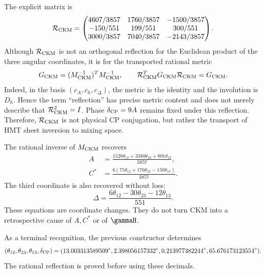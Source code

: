 The explicit matrix is
\begin{equation}
\label{eq:modular-Rckm-matrix}
\mathcal R_{\rm CKM}=
\begin{pmatrix}
4607/3857&1760/3857&-1500/3857\\
-150/551&199/551&300/551\\
3000/3857&7040/3857&-2143/3857
\end{pmatrix}.
\end{equation}
Although \(\mathcal R_{\rm CKM}\) is not an orthogonal reflection for the
Euclidean product of the three angular coordinates, it is for the
transported rational metric
\begin{equation}
\label{eq:modular-ckm-metric}
G_{\rm CKM}=(M_{\rm CKM}^{-1})^TM_{\rm CKM}^{-1},
\qquad
\mathcal R_{\rm CKM}^TG_{\rm CKM}\mathcal R_{\rm CKM}=G_{\rm CKM}.
\end{equation}
Indeed, in the basis \((c_A,c_h,c_\Delta)\), the metric is the identity
and the involution is \(D_h\). Hence the term ``reflection'' has
precise metric content and does not merely describe that
\(\mathcal R_{\rm CKM}^2=I\).
Phase \(\delta_{\rm CP}=9A\) remains fixed under this reflection. Therefore,
\(\mathcal R_{\rm CKM}\) is not physical CP conjugation, but rather the
transport of HMT sheet inversion to mixing space.

The rational inverse of \(M_{\rm CKM}\) recovers
\begin{align}
A&=\frac{1528\theta_{12}+3380\theta_{23}+801\theta_{13}}{3857},
\label{eq:modular-A-from-ckm}\\
C^*&=\frac{6(75\theta_{12}+176\theta_{23}-150\theta_{13})}{3857}.
\label{eq:modular-C-from-ckm}
\end{align}
The third coordinate is also recovered without loss:
\begin{equation}
\label{eq:modular-Delta-from-ckm}
\Delta
=\frac{6\theta_{12}-30\theta_{23}-12\theta_{13}}{551}.
\end{equation}
These equations are coordinate changes. They do not turn CKM into a
retrospective cause of \(A,C^*\) or of \(\gammaH\).

As a terminal recognition, the previous constructor determines
\begin{equation}
\label{eq:modular-ckm-values}
(\theta_{12},\theta_{23},\theta_{13},\delta_{\rm CP})
=(13.003313589509^\circ,
2.398056157332^\circ,
0.213977382244^\circ,
65.676173123554^\circ).
\end{equation}
The rational reflection is proved before using these decimals.

